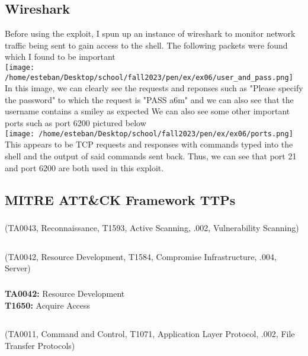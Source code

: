 \documentclass[notitlepage]{article}
\begin{document}
    \subsection{Wireshark}
        Before using the exploit, I spun up an instance of wireshark to monitor network traffic being sent
        to gain access to the shell. The following packets were found which I found to be important \\
\texttt{[image: /home/esteban/Desktop/school/fall2023/pen/ex/ex06/user\_and\_pass.png]}\\
        In this image, we can clearly see the requests and reponses such as "Please specify the password" 
        to which the request is "PASS a6m" and we can also see that the username contains a smiley as expected
        We can also see some other important ports such as port 6200 pictured below\\
\texttt{[image: /home/esteban/Desktop/school/fall2023/pen/ex/ex06/ports.png]}\\
        This appears to be TCP requests and responses with commands typed into the shell and the output of
        said commands sent back. Thus, we can see that port 21 and port 6200 are both used in this exploit.

   \subsection{MITRE ATT{\&}CK Framework TTPs}    
	
    \subsubsection*{}
    \ttp(TA0043, Reconnaissance, T1593, Active Scanning, .002, Vulnerability Scanning)
    \subsection*{}
    \ttp(TA0042, Resource Development, T1584, Compromise Infrastructure, .004, Server)
    \subsubsection*{}
    \textbf{TA0042:} Resource Development \\
    \indent \textbf{T1650:} Acquire Access \\
    \subsection*{}
    \ttp(TA0011, Command and Control, T1071, Application Layer Protocol, .002, File Transfer Protocols)
\end{document}

